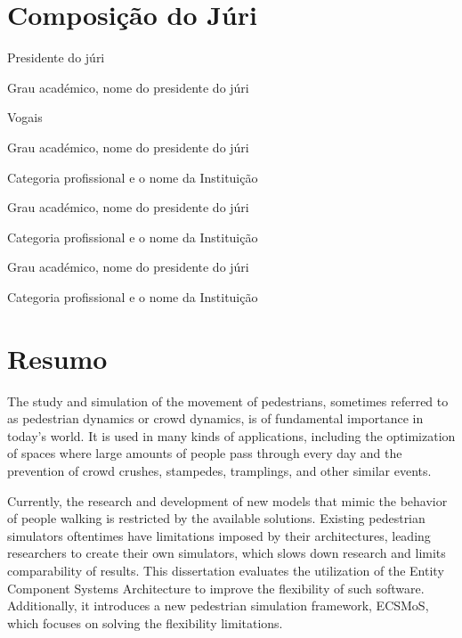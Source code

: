 \documentclass[twoside, 11pt]{article}
\begin{document}
 
\blankpage
\newpage

\section*{Composição do Júri}

\noindent Presidente do júri

Grau académico, nome do presidente do júri

\noindent Vogais

Grau académico, nome do presidente do júri

Categoria profissional e o nome da Instituição

\vspace{1cm}

Grau académico, nome do presidente do júri

Categoria profissional e o nome da Instituição

\vspace{1cm}

Grau académico, nome do presidente do júri

Categoria profissional e o nome da Instituição

\clearpage            %
\null                %
\newpage             %

\section*{Resumo}

The study and simulation of the movement of pedestrians, sometimes referred to as pedestrian dynamics or crowd dynamics, is of fundamental importance in today's world. It is used in many kinds of applications, including the optimization of spaces where large amounts of people pass through every day and the prevention of crowd crushes, stampedes, tramplings, and other similar events.

Currently, the research and development of new models that mimic the behavior of people walking is restricted by the available solutions. Existing pedestrian simulators oftentimes have limitations imposed by their architectures, leading researchers to create their own simulators, which slows down research and limits comparability of results. This dissertation evaluates the utilization of the Entity Component Systems Architecture to improve the flexibility of such software. Additionally, it introduces a new pedestrian simulation framework, ECSMoS, which focuses on solving the flexibility limitations.
\end{document}
